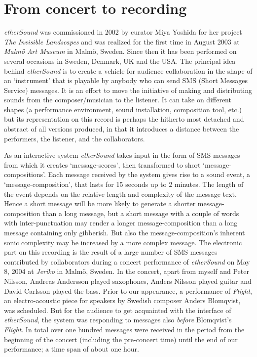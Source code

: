 \section*{From concert to recording}
\label{sec:concert-recording}


\emph{etherSound} was commissioned in 2002 by curator Miya Yoshida for
her project \emph{The Invisible Landscapes} and was realized for the
first time in August 2003 at \emph{Malm\"{o} Art Museum} in Malm\"{o},
Sweden. Since then it has been performed on several occasions in
Sweden, Denmark, UK and the USA. The principal idea behind
\emph{etherSound} is to create a vehicle for audience collaboration in
the shape of an `instrument' that is playable by anybody who can send
SMS (Short Messages Service) messages. It is an effort to move the
initiative of making and distributing sounds from the
composer/musician to the listener. It can take on different shapes (a
performance environment, sound installation, composition tool, etc.)
but its representation on this record is perhaps the hitherto most
detached and abstract of all versions produced, in that it introduces
a distance between the performers, the listener, and the
collaborators.

As an interactive system \emph{etherSound} takes input in the form of
SMS messages from which it creates `message-scores', then transformed
to short  `message-compositions'. Each message
received by the system gives rise to a sound event, a
`message-composition', that lasts for 15 seconds up to 2 minutes. The
length of the event depends on the relative length and complexity of
the message text. Hence a short message will be more likely to
generate a shorter message-composition than a long message, but a
short message with a couple of words with inter-punctuation may render
a longer message-composition than a long message containing only
gibberish. But also the message-composition's inherent sonic
complexity may be increased by a more complex message. The electronic
part on this recording is the result of a large number of SMS messages
contributed by collaborators during a concert performance of
\emph{etherSound} on May 8, 2004 at \emph{Jeriko} in Malm\"{o},
Sweden. In the concert, apart from myself and Peter Nilsson, Andreas
Andersson played saxophones, Anders Nilsson played guitar and David
Carlsson played the bass. Prior to our appearance, a performance of
\emph{Flight}, an electro-acoustic piece for speakers by Swedish
composer Anders Blomqvist, was scheduled. But for the audience to get
acquainted with the interface of \emph{etherSound}, the system was
responding to messages also \emph{before} Blomqvist's
\emph{Flight}. In total over one hundred messages were received in
the period from the beginning of the concert (including the
pre-concert time) until the end of our performance; a time span of
about one hour.


